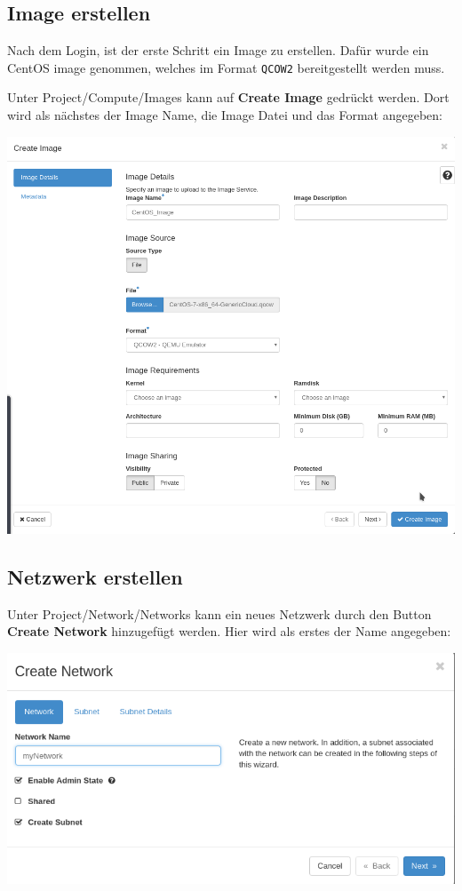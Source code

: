\subsection{Image erstellen}
Nach dem Login, ist der erste Schritt ein Image zu erstellen. Dafür wurde ein CentOS image genommen, welches im Format \verb|QCOW2| bereitgestellt werden muss. 

Unter Project/Compute/Images kann auf \textbf{Create Image} gedrückt werden. Dort wird als nächstes der Image Name, die Image Datei und das Format angegeben:

\begin{minipage}{\linewidth}
	\centering
	\includegraphics[width=.8\linewidth]{images/createimage}
\end{minipage}
\subsection{Netzwerk erstellen}
Unter Project/Network/Networks kann ein neues Netzwerk durch den Button \textbf{Create Network} hinzugefügt werden. Hier wird als erstes der Name angegeben:

\begin{minipage}{\linewidth}
	\centering
	\includegraphics[width=.8\linewidth]{images/networkname}
\end{minipage}

